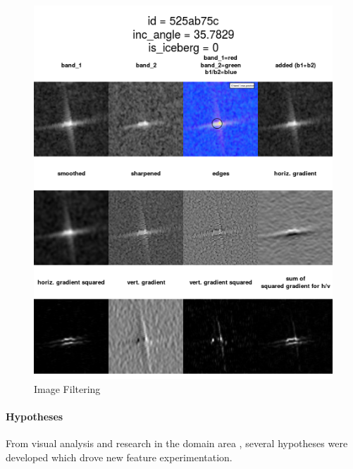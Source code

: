 \documentclass[fleqn,10pt]{SelfArx} %
\begin{document}
\begin{figure}\centering
	\includegraphics[width=.9\linewidth]{iceberg/analysis/525ab75c.png}
	\caption{Image Filtering}\label{filtering}
\end{figure}

\paragraph{Hypotheses} From visual analysis and research in the domain area \cite{wesche} \cite{Ship-Iceberg_CNN} \cite{howell}, several hypotheses were developed which drove new feature experimentation.
\end{document}
